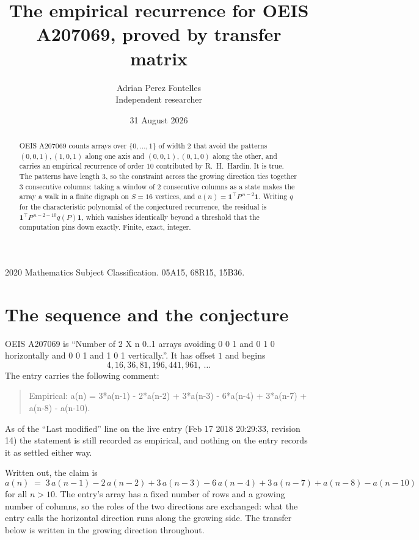 \documentclass[11pt,a4paper]{article}
\title{The empirical recurrence for OEIS A207069, proved by transfer matrix}
\author{Adrian Perez Fontelles\\ \small Independent researcher}
\date{31 August 2026}
\theoremstyle{plain}
\theoremstyle{definition}
\begin{document}
\maketitle

\begin{abstract}
OEIS A207069 counts arrays over $\{0,\dots,1\}$ of width $2$ that avoid the patterns
$(0,0,1), (1,0,1)$ along one axis and $(0,0,1), (0,1,0)$ along the other, and carries an empirical recurrence of
order $10$ contributed by R.~H.~Hardin. It is true. The patterns have length $3$, so
the constraint across the growing direction ties together $3$ consecutive columns: taking a
window of $2$ consecutive columns as a state makes the array a walk in a finite digraph
on $S=16$ vertices, and $a(n)=\mathbf{1}^{\!\top}P^{\,n-2}\mathbf{1}$. Writing $q$
for the characteristic polynomial of the conjectured recurrence, the residual is
$\mathbf{1}^{\!\top}P^{\,n-2-10}q(P)\mathbf{1}$, which vanishes identically
beyond a threshold that the computation pins down exactly. Finite, exact, integer.
\end{abstract}

\noindent\small 2020 Mathematics Subject Classification. 05A15, 68R15, 15B36.\normalsize

\section{The sequence and the conjecture}

OEIS A207069 is ``Number of 2 X n 0..1 arrays avoiding 0 0 1 and 0 1 0 horizontally and 0 0 1 and 1 0 1 vertically.''. It has offset
$1$ and begins
\[
4, 16, 36, 81, 196, 441, 961,\ \dots
\]
The entry carries the following comment:
\begin{quote}\small
Empirical: a(n) = 3*a(n-1) - 2*a(n-2) + 3*a(n-3) - 6*a(n-4) + 3*a(n-7) + a(n-8) - a(n-10).
\end{quote}
As of the ``Last modified'' line on the live entry (Feb 17 2018 20:29:33, revision
14) the statement is still recorded as empirical, and nothing on the entry
records it as settled either way.

Written out, the claim is
\begin{equation}\label{eq:conj}
a(n)\;=\;3\,a(n-1) - 2\,a(n-2) + 3\,a(n-3) - 6\,a(n-4) + 3\,a(n-7) + a(n-8) - a(n-10)
\end{equation}
for all $n>10$. The entry's array has a fixed number of rows and a growing number of
columns, so the roles of the two directions are exchanged: what the entry calls the
horizontal direction runs along the growing side. The transfer below is written in the
growing direction throughout.
\end{document}
